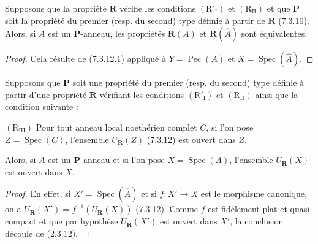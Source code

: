 \begin{proposition}[7.3.17]
\label{IV.2.s7.3.17-fr}
Supposons que la propriété $\boldsymbol R$ vérifie les conditions
$(\mathrm R'_{\mathrm I})$ et $(\mathrm R_{\mathrm{II}})$ et que
$\boldsymbol P$ soit la propriété du premier (resp. du second) type
définie à partir de $\boldsymbol R$ (7.3.10). Alors, si $A$ est un
$\boldsymbol P$-anneau, les propriétés $\boldsymbol R(A)$ et
$\boldsymbol R(\widehat A)$ sont équivalentes.
\end{proposition}

\begin{proof}
Cela résulte de (7.3.12.1) appliqué à
$Y=\operatorname{Pec}(A)$ et $X=\operatorname{Spec}(\widehat A)$.
\end{proof}

\begin{proposition}[7.3.18]
\label{IV.2.s7.3.18-fr}
Supposons que $\boldsymbol P$ soit une propriété du premier (resp. du
second) type définie à partir d'une propriété $\boldsymbol R$ vérifiant
les conditions $(\mathrm R'_{\mathrm I})$ et
$(\mathrm R_{\mathrm{II}})$ ainsi que la condition suivante :

$(\mathrm R_{\mathrm{III}})$ Pour tout anneau local noethérien complet
$C$, si l'on pose $Z=\operatorname{Spec}(C)$, l'ensemble
$U_{\boldsymbol R}(Z)$ (7.3.12) est ouvert dans $Z$.

Alors, si $A$ est un $\boldsymbol P$-anneau et si l'on pose
$X=\operatorname{Spec}(A)$, l'ensemble $U_{\boldsymbol R}(X)$ est ouvert
dans $X$.
\end{proposition}

\begin{proof}
En effet, si $X'=\operatorname{Spec}(\widehat A)$ et si $f:X'\to X$ est
le morphisme canonique, on a
$U_{\boldsymbol R}(X')=f^{-1}(U_{\boldsymbol R}(X))$ (7.3.12). Comme $f$
est fidèlement plat et quasi-compact et que par hypothèse
$U_{\boldsymbol R}(X')$ est ouvert dans $X'$, la conclusion découle de
(2.3.12).
\end{proof}

